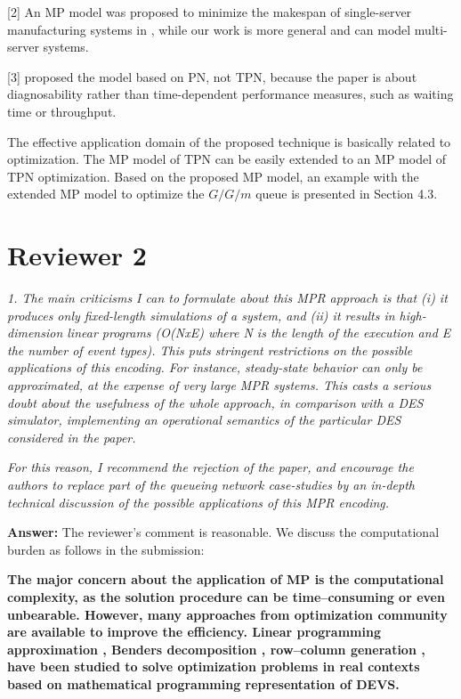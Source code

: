 \documentclass[suppldata]{interact}
\begin{document}
[2] An MP model was proposed to minimize the makespan of single-server manufacturing systems in \cite{di2020makespan}, %
while our work is more general and can model multi-server systems. 

[3] \cite{basile2012k} proposed the model based on PN, not TPN, because %
the paper is about diagnosability %
rather than time-dependent performance measures, such as waiting time or throughput. 


The effective application domain of the proposed technique is basically related to optimization. The MP model of TPN %
can be easily extended to an MP model of TPN optimization. Based on the proposed MP model, an example with the extended MP model to optimize the $G/G/m$ queue is presented in Section 4.3.


\section{Reviewer 2}

\textit{1. The main criticisms I can to formulate about this MPR approach is that
(i) it produces only fixed-length simulations of a system, and (ii) it
results in high-dimension linear programs (O(NxE) where N is the
length of the execution and E the number of event types). This puts
stringent restrictions on the possible applications of this
encoding. For instance, steady-state behavior can only be
approximated, at the expense of very large MPR systems. This casts a
serious doubt about the usefulness of the whole approach, in
comparison with a DES simulator, implementing an operational
semantics of the particular DES considered in the paper.}

\textit{{For this reason, I recommend the rejection of the paper, and encourage the authors to replace part of the queueing network case-studies by an in-depth technical discussion of the possible applications of this MPR encoding.}}

\noindent
\noindent
\textbf{Answer:} The reviewer's comment is reasonable. We discuss the computational burden as follows in the submission:

\textbf{The major concern about the application of MP is the computational complexity, %
as the solution procedure can be time--consuming or even unbearable. However, many approaches from optimization community are available to improve the efficiency. Linear programming approximation \citep{alfieri2012mathematical}, Benders decomposition \citep{weiss2015buffer}, row--column generation \citep{alfieri2020time}, have been studied to solve optimization problems in %
real contexts based on mathematical programming representation of DEVS.}
\end{document}
